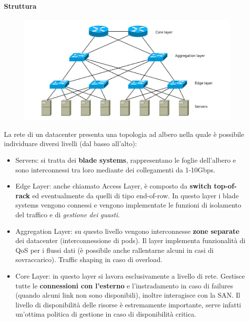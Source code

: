 \documentclass{article}
\providecommand{\tightlist}{%
		  \setlength{\itemsep}{0pt}\setlength{\parskip}{0pt}}
\begin{document}
		\paragraph{Struttura}\label{struttura}
		
		\begin{figure}[ht]
			\centering
			\includegraphics[width=0.7\linewidth]{images/SAC_B7_treetopology}
			\label{fig:sacb7topology}
		\end{figure}
		
		La rete di un datacenter presenta una topologia ad albero nella
		quale è possibile individuare diversi livelli (dal basso all'alto):
		
		\begin{itemize}
		\tightlist
		\item
		  Servers: si tratta dei \textbf{blade systems}, rappresentano le foglie dell'albero e sono interconnessi tra loro mediante dei collegamenti da 1-10Gbps.
		\item
		  Edge Layer: anche chiamato Access Layer, è composto da \textbf{switch top-of-rack} ed eventualmente da quelli di tipo end-of-row. In questo layer i blade systems vengono connessi e vengono implementate le funzioni di isolamento del traffico e di \emph{gestione dei guasti}.
		\item
		  Aggregation Layer: su questo livello vengono interconnesse \textbf{zone separate} dei datacenter (interconnessione di pods). Il layer implementa funzionalità di QoS per i flussi dati (è possibile anche rallentarne alcuni in casi di sovraccarico). Traffic shaping in caso di overload.
		\item
		  Core Layer: in questo layer si lavora esclusivamente a livello di rete. Gestisce tutte le \textbf{connessioni con l'esterno} e
		  l'instradamento in caso di failures (quando alcuni link non sono disponibili), inoltre interagisce con la SAN. Il livello di disponibilità delle risorse è estremamente importante, serve infatti un'ottima politica di gestione in caso di
		  disponibilità critica.
		\end{itemize}
		
\end{document}
